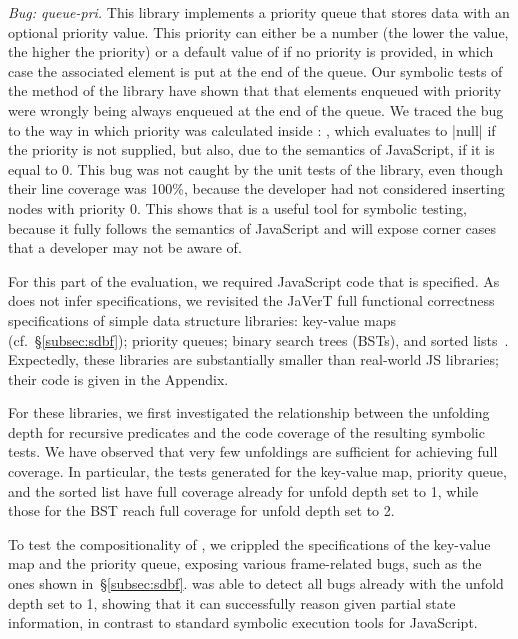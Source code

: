 \smallskip
\noindent \emph{Bug: queue-pri.} This library implements a priority queue that stores data with an optional priority value.
This priority can either be a number (the lower the value, the higher the priority) or a default value of  if no priority is provided, in which case the associated element is put at the end of the queue.
Our symbolic tests of the  method of the library have shown that that elements enqueued with priority  were wrongly being always enqueued at the end of the queue. We traced the bug to the way in which priority was calculated inside : , which evaluates to \jsinline|null| if the priority is not supplied, but also, due to the semantics of JavaScript, if it is equal to 0. This bug was not caught by the unit tests of the library, even though their line coverage was 100\%, because the developer had not considered inserting nodes with priority 0. This shows that \cosette is a useful tool for symbolic testing, because it fully follows the semantics of JavaScript and will expose corner cases that a developer may not be aware of.

 For this part of the evaluation, we required  JavaScript code that is specified. As \cosette does not infer specifications, we revisited the JaVerT full functional correctness specifications of simple data structure libraries: key-value maps (cf.~\S\ref{subsec:sdbf}); priority queues; binary search trees (BSTs), and sorted lists~\cite{javert}. Expectedly, these libraries are substantially smaller than real-world JS libraries; their code is given in the Appendix.

For these libraries, we first investigated the relationship between the unfolding depth for recursive predicates and the code coverage of the resulting symbolic tests. We have observed that very few unfoldings are sufficient for achieving full coverage. In particular, the tests generated for the key-value map, priority queue, and the sorted list have full coverage already for unfold depth set to 1, while those for the BST reach full coverage for unfold depth set to 2. 


To test the compositionality of \cosette, we crippled the specifications of the key-value map and the priority queue, exposing various frame-related bugs, such as the ones shown in~\S\ref{subsec:sdbf}. \cosette was able to detect all bugs already with the unfold depth set to 1, showing that it can successfully reason given partial state information, in contrast to standard symbolic execution tools for JavaScript.

